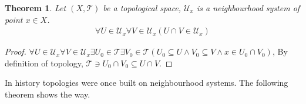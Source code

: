\documentclass[openany]{book}
\theoremstyle{plain}
\newtheorem{theorem}{Theorem}[section] %
\theoremstyle{definition}
\begin{document}
\begin{theorem}
Let $(X,\mathscr T)$ be a topological space, $\mathscr U_x$ is a neighbourhood system of point $x\in X$.
\begin{align*}
	\forall U\in \mathscr U_x\forall V\in \mathscr U_x( U\cap V\in \mathscr U_x)
\end{align*}
\end{theorem}
\begin{proof}
$\forall U\in \mathscr U_x\forall V\in \mathscr U_x\exists U_0\in \mathscr T\exists V_0\in \mathscr T(U_0\subseteq U\wedge V_0\subseteq V\wedge x\in U_0\cap V_0 )$, By definition of topology, $\mathscr T\ni U_0\cap V_0\subseteq U\cap V$. 
\end{proof}

In history topologies were once built on neighbourhood systems. The following theorem shows the way.
 
\end{document}
